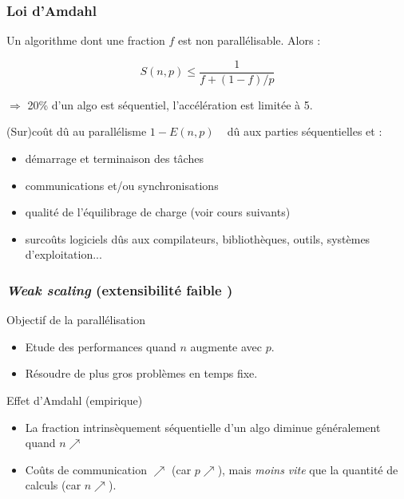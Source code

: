 \documentclass[xcolor={x11names,svgnames}]{beamer}
\begin{document}

\begin{frame}
\frametitle{Loi d'Amdahl}

Un algorithme dont une fraction $f$ est non
parallélisable. Alors :

\[
  S(n,p)  \leq  \frac{1}{f + (1 - f)/p}
\]

$\Rightarrow$ 20\% d'un algo est séquentiel, l'accélération est 
limitée à 5.

\bigskip

(Sur)co\^ut d\^u au parallélisme \og $1-E(n,p)$ \fg~ 
d\^u aux parties séquentielles et :
\begin{itemize}
\item démarrage et terminaison des tâches 
\item communications et/ou synchronisations  
\item qualité de l'équilibrage de charge (voir cours suivants)
\item surcoûts logiciels dûs aux
  compilateurs, bibliothèques, outils, systèmes d'exploitation... 
\end{itemize}

\end{frame}

\begin{frame}
\frametitle{\emph{Weak scaling} (\og extensibilité faible \fg)}

\begin{alertblock}{Objectif de la parallélisation}
  \begin{itemize}
  \item Etude des performances quand $n$ augmente avec $p$.
  \item Résoudre de plus gros problèmes en temps fixe.
  \end{itemize}
\end{alertblock}

\medskip

\begin{exampleblock}{Effet d'Amdahl (empirique)}
\begin{itemize}
\item La fraction intrinsèquement séquentielle d'un algo diminue généralement quand $n \nearrow$
\item Coûts de communication $\nearrow$ (car $p \nearrow$), mais \emph{moins
    vite} que la quantité de calculs (car $n \nearrow$).
\end{itemize}
\end{exampleblock}
\end{frame}
\end{document}
